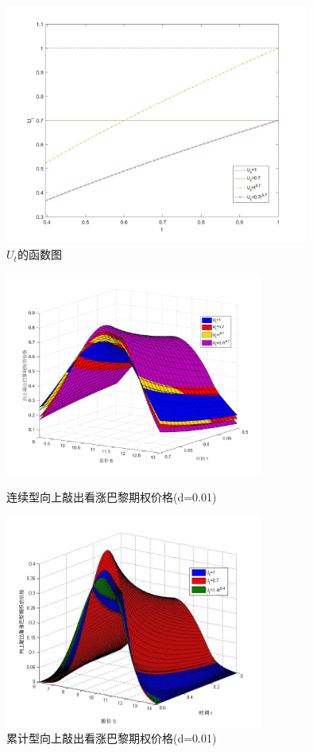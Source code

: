 \documentclass{ctexart} %
\begin{document}
\begin{figure}[H]
\label{ut}
\centering
\includegraphics[width=10cm]{code/ut.jpg}
\caption{$U_t$的函数图}
\end{figure}

\begin{figure}[H]
\label{mg1}
\begin{minipage}{0.48\linewidth}
\includegraphics[width=8.5cm]{code/mg1.jpg}
\caption{连续型向上敲出看涨巴黎期权价格(d=0.01)}
\end{minipage}
\begin{minipage}{0.48\linewidth}
\includegraphics[width=8.5cm]{code/mc1.jpg}
\caption{累计型向上敲出看涨巴黎期权价格(d=0.01)}
\end{minipage}
\end{figure}
\end{document}
